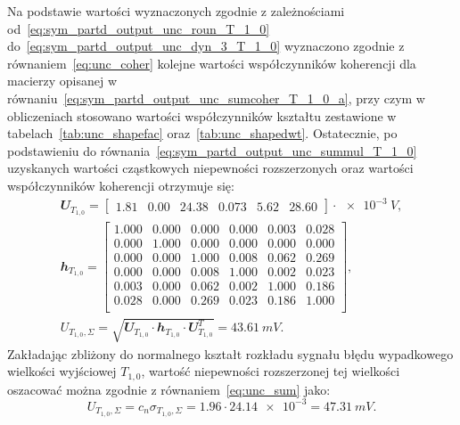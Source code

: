 Na podstawie wartości wyznaczonych zgodnie z zależnościami od~\eqref{eq:sym_partd_output_unc_roun_T_1_0} do~\eqref{eq:sym_partd_output_unc_dyn_3_T_1_0} wyznaczono zgodnie z równaniem~\eqref{eq:unc_coher} kolejne wartości współczynników koherencji dla macierzy opisanej w równaniu~\eqref{eq:sym_partd_output_unc_sumcoher_T_1_0_a}, przy czym w obliczeniach stosowano wartości współczynników kształtu zestawione w tabelach~\ref{tab:unc_shapefac} oraz~\ref{tab:unc_shapedwt}. Ostatecznie, po podstawieniu do równania~\eqref{eq:sym_partd_output_unc_summul_T_1_0} uzyskanych wartości cząstkowych niepewności rozszerzonych oraz wartości współczynników koherencji otrzymuje się:
\begin{gather}
\mathbfit{U}_{T_{1,0}} =
\begin{bmatrix}
\num{1.81} & \num{0.00} & \num{24.38} & \num{0.073} & \num{5.62} & \num{28.60}
\end{bmatrix} \cdot \qty{e-3}{V}
\label{eq:sym_partd_output_unc_sumuvectval_T_1_0}, \\
\mathbfit{h}_{T_{1,0}} =
\begin{bmatrix}
\num{1.000} & \num{0.000} & \num{0.000} & \num{0.000} & \num{0.003} & \num{0.028} \\
\num{0.000} & \num{1.000} & \num{0.000} & \num{0.000} & \num{0.000} & \num{0.000} \\
\num{0.000} & \num{0.000} & \num{1.000} & \num{0.008} & \num{0.062} & \num{0.269} \\
\num{0.000} & \num{0.000} & \num{0.008} & \num{1.000} & \num{0.002} & \num{0.023} \\
\num{0.003} & \num{0.000} & \num{0.062} & \num{0.002} & \num{1.000} & \num{0.186} \\
\num{0.028} & \num{0.000} & \num{0.269} & \num{0.023} & \num{0.186} & \num{1.000} \\
\end{bmatrix}
\label{eq:sym_partd_output_unc_sumcoherval_T_1_0_a}, \\
U_{T_{1,0},\Sigma} = \sqrt{\mathbfit{U}_{T_{1,0}} \cdot \mathbfit{h}_{T_{1,0}} \cdot \mathbfit{U}_{T_{1,0}}^{T}} = \qty{43.61}{mV} \label{eq:sym_partd_output_unc_total_b_T_1_0}.
\end{gather}
Zakładając zbliżony do normalnego kształt rozkładu sygnału błędu wypadkowego wielkości wyjściowej $T_{1,0}$, wartość niepewności rozszerzonej tej wielkości oszacować można zgodnie z równaniem~\eqref{eq:unc_sum} jako:
\begin{equation}
U_{T_{1,0},\Sigma} = c_{n} \sigma_{T_{1,0},\Sigma} = \num{1.96} \cdot \num{24.14e-3} = \qty{47.31}{mV} \label{eq:sym_partd_output_unc_total_a_T_1_0}.
\end{equation}

